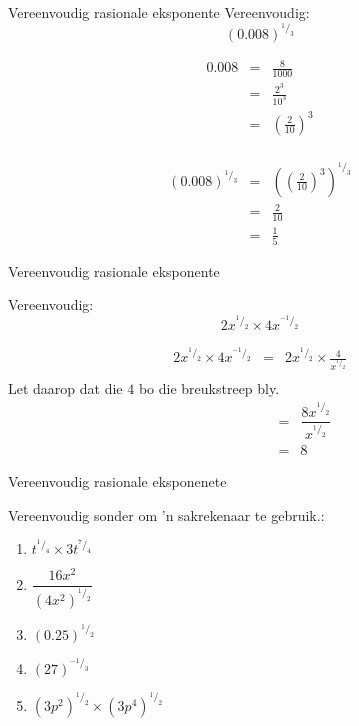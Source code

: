 \begin{wex}
{%
Vereenvoudig rasionale eksponente
} 
{%
Vereenvoudig: 
$$ (0.008)^{^1/_3} $$
}
{%

\begin{eqnarray*}
 0.008 & = & \frac{8}{1000} \\
       & = & \frac{2^3}{10^3} \\
       & = & \left(\frac{2}{10}\right)^3\\
\end{eqnarray*}

\begin{eqnarray*}
 (0.008)^{^1/_3} & = & \left(\left(\frac{2}{10}\right)^3\right)^{^1/_3} \\
		 & = & \frac{2}{10} \\
		 & = & \frac{1}{5}
\end{eqnarray*}
}
\end{wex}

\begin{wex}
{%
Vereenvoudig rasionale eksponente 
}

{
Vereenvoudig:
$$ 2x^{^1/_2} \times 4x^{^{-1}/_{2}} $$
}
{%
\begin{eqnarray*}
 2x^{^1/_2} \times 4x^{^{-1}/_{2}} & = & 2x^{^1/_2} \times \frac{4}{x^{^1/_2}} \\
\end{eqnarray*}
Let daarop dat die $4$ bo die breukstreep bly.\\

\begin{eqnarray*}
 \phantom{2x^{^1/_2} \times 4x^{^{-1}/_{2}}} & = & \dfrac{8x^{^1/_2}}{x^{^1/_2}} \\
					     & = & 8
\end{eqnarray*}


}
\end{wex}

\begin{exercises}{Vereenvoudig rasionale eksponenete}
{
Vereenvoudig sonder om ’n sakrekenaar te gebruik.:
\begin{multicols}{2}
\begin{enumerate}[noitemsep, label=\textbf{\arabic*}., itemsep=5pt]
 \item $ t^{^1/_4} \times 3t^{^7/_4} $
 \item $ \dfrac{16x^2}{(4x^2)^{^1/_2}} $
 \item $ (0.25)^{^1/_2} $
 \item $ (27)^{^{-1}/_3} $
 \item $ (3p^2)^{^1/_2} \times (3p^4)^{^1/_2} $
\end{enumerate}
\end{multicols}

}
\end{exercises}



